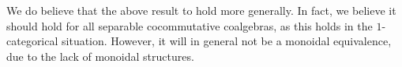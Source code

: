 \begin{remark}
    \label{ch2:rm:holds-generally-for-separable}
    We do believe that the above result to hold more generally. In fact, we believe it should hold for all separable cocommutative coalgebras, as this holds in the $1$-categorical situation. However, it will in general not be a monoidal equivalence, due to the lack of monoidal structures. 
\end{remark}



